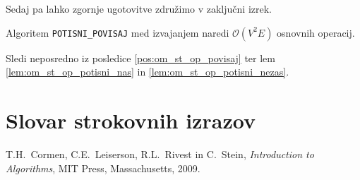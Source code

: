 \documentclass[mat1]{fmfdelo}
\begin{document}
Sedaj pa lahko zgornje ugotovitve združimo v zaključni izrek.

\begin{izrek}
Algoritem \texttt{POTISNI\_POVISAJ} med izvajanjem naredi $\mathcal{O}(V^2E)$ osnovnih operacij.
\end{izrek}

\begin{dokaz}
Sledi neposredno iz posledice \ref{pos:om_st_op_povisaj} ter lem \ref{lem:om_st_op_potisni_nas} in \ref{lem:om_st_op_potisni_nezas}.
\end{dokaz}
























\newpage


\section*{Slovar strokovnih izrazov}

\geslo{}{}
\geslo{}{}


\begin{thebibliography}{99}

T.H.~Cormen, C.E.~Leiserson, R.L.~Rivest in C.~Stein, \emph{Introduction to Algorithms}, MIT Press, Massachusetts, 2009.

\end{thebibliography}
\end{document}
